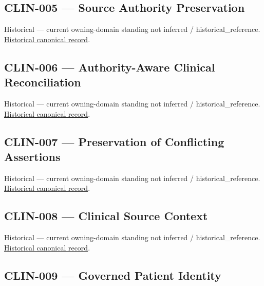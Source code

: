 \subsection{CLIN-005 — Source Authority Preservation}

\par\label{element:5f399a338688438c922df969e724a24a}
Historical — current owning-domain standing not inferred / historical\_reference. \href{../../../../continuum/motivation/requirement/5f399a338688438c922df969e724a24a.md}{Historical canonical record}.\par

\subsection{CLIN-006 — Authority-Aware Clinical Reconciliation}

\par\label{element:3d7c709a435145e3821184b2c9b980fa}
Historical — current owning-domain standing not inferred / historical\_reference. \href{../../../../continuum/motivation/requirement/3d7c709a435145e3821184b2c9b980fa.md}{Historical canonical record}.\par

\subsection{CLIN-007 — Preservation of Conflicting Assertions}

\par\label{element:cd669acb9a76499db70b5d092917a56b}
Historical — current owning-domain standing not inferred / historical\_reference. \href{../../../../continuum/motivation/requirement/cd669acb9a76499db70b5d092917a56b.md}{Historical canonical record}.\par

\subsection{CLIN-008 — Clinical Source Context}

\par\label{element:591d9b8007504d2382ae7977a6589742}
Historical — current owning-domain standing not inferred / historical\_reference. \href{../../../../continuum/motivation/requirement/591d9b8007504d2382ae7977a6589742.md}{Historical canonical record}.\par

\subsection{CLIN-009 — Governed Patient Identity}

